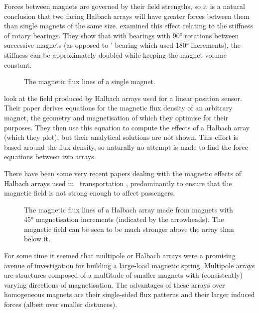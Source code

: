 \textcite{choi2008}

Forces between magnets are governed by their field strengths, so
it is a natural conclusion that two facing Halbach arrays will
have greater forces between them than single magnets of the same
size. \textcite{yonnet1991} examined this effect relating to the
stiffness of rotary bearings. They show that with bearings with
\ang{90} rotations between successive magnets (as opposed to
\citeauthor{backers1961}' %
bearing which used \ang{180}
increments), the stiffness can be approximately doubled while
keeping the magnet volume constant.

\begin{figure}
\caption{The magnetic flux lines of a single magnet.}
\end{figure}

\textcite{bancel1998} look at the field produced by Halbach
arrays used for a linear position sensor. Their paper derives
equations for the magnetic flux density of an arbitrary magnet,
the geometry and magnetisation of which they optimise for their
purposes. They then use this equation to compute the effects of
a Halbach array (which they plot), but their analytical
solutions are not shown. This effort is based around the flux
density, so naturally no attempt is made to find the force
equations between two arrays.

There have been some very recent papers dealing with the
magnetic effects of Halbach arrays used in \maglev\
transportation \cite{hoburg2004}, predominantly to ensure
that the magnetic field is not strong enough to affect
passengers.

\begin{figure}
\caption[Magnetic flux lines of a Halbach array.]{%
  The magnetic flux lines of a Halbach array made from magnets with \ang{45} 
  magnetisation increments (indicated by the arrowheads). The magnetic field 
  can be seen to be much stronger above the array than below it.}
\figlabel{halbach}
\end{figure}

For some time it seemed that multipole or Halbach arrays were a
promising avenue of investigation for building a large-load magnetic
spring. Multipole arrays are structures composed of a multitude of
smaller magnets with (consistently) varying directions of
magnetisation. The advantages of these arrays over homogeneous magnets
are their single-sided flux patterns and their larger induced forces
(albeit over smaller distances).

